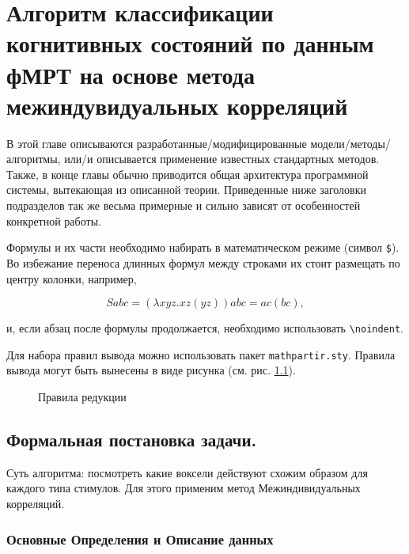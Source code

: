  \chapter{Алгоритм классификации когнитивных состояний по данным фМРТ на основе метода межиндувидуальных корреляций}

В этой главе описываются разработанные/модифицированные модели/методы/
алгоритмы, или/и описывается применение известных стандартных методов. Также, 
в конце главы обычно приводится общая архитектура программной системы, 
вытекающая из описанной теории. Приведенные ниже заголовки подразделов так же 
весьма примерные и сильно зависят от особенностей конкретной работы.

Формулы и их части необходимо набирать в математическом режиме
(символ \verb|$|). Во избежание переноса длинных формул между строками их 
стоит размещать по центру колонки, например,

$$S a b c = (\lambda x y z. x z (y z)) a b c = a c (b c),$$

\noindent и, если абзац после формулы продолжается, необходимо использовать 
\verb|\noindent|.

Для набора правил вывода можно использовать пакет \texttt{mathpartir.sty}. 
Правила вывода могут быть вынесены в виде рисунка (см. рис. 
\ref{img:inferrules}).

\begin{figure}[t]
  \centering
  \caption{Правила редукции}
  \label{img:inferrules}
\end{figure}

\section{Формальная постановка задачи.}
\begin{annotation}
	Суть алгоритма: посмотреть какие воксели действуют схожим образом для каждого типа стимулов. Для этого применим метод Межиндивидуальных корреляций.
\end{annotation}

\subsection*{Основные Определения и Описание данных}




